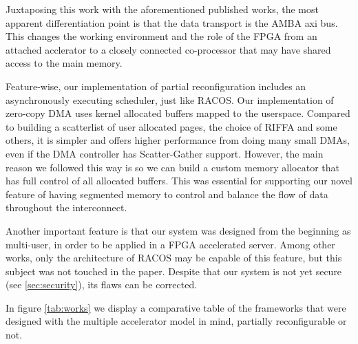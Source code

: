 Juxtaposing this work with the aforementioned published works, the most apparent differentiation point is that
the data transport is the AMBA \gls{axi} bus. This changes the working environment and the role of the FPGA
from an attached acclerator to a closely connected co-processor that may have shared access to the main memory.

Feature-wise, our implementation of partial reconfiguration includes an asynchronously executing scheduler, just like RACOS.
Our implementation of zero-copy DMA uses kernel allocated buffers mapped to the userspace. Compared to building a scatterlist
of user allocated pages, the choice of RIFFA and some others, 
it is simpler and offers higher performance from doing many small DMAs, even if the DMA controller has Scatter-Gather support.
However, the main reason we followed this way is so we can build a custom memory allocator that has full control of
all allocated buffers. This was essential for supporting our novel feature of having segmented memory to control and balance
the flow of data throughout the interconnect.

Another important feature is that our system was designed from the beginning as multi-user, 
in order to be applied in a FPGA accelerated server. 
Among other works, only the architecture of RACOS may be capable of this feature, but this subject was not touched in the paper.
Despite that our system is not yet secure (see \ref{sec:security}), its flaws can be corrected.

In figure \ref{tab:works} we display a comparative table of the frameworks that 
were designed with the multiple accelerator model in mind, partially reconfigurable or not.


